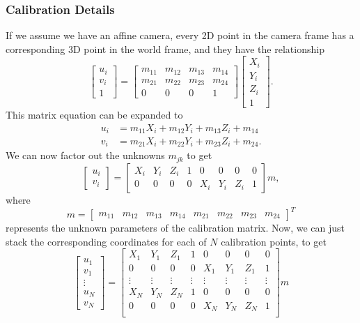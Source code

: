 \documentclass[letterpaper, 10 pt, conference]{ieeeconf}  %
\begin{document}
\subsubsection{Calibration Details}
If we assume we have an affine camera, every 2D point in the camera frame has a corresponding 3D point in the world frame, and they have the relationship
\[
\left[\begin{array}{c}u_i \\v_i \\1\end{array}\right] =  
\left[\begin{array}{cccc}
m_{11} & m_{12} & m_{13} & m_{14} \\
m_{21} & m_{22} & m_{23} & m_{24} \\
0 & 0 & 0 & 1\end{array}\right]
\left[\begin{array}{c}X_i\\Y_i\\Z_i\\1\end{array}\right].
\]
This matrix equation can be expanded to
\begin{align*}
u_i &= m_{11}X_i + m_{12} Y_i + m_{13}Z_i + m_{14}\\
v_i &= m_{21}X_i + m_{22} Y_i + m_{23}Z_i + m_{24}.
\end{align*}
We can now factor out the unknowns $m_{jk}$ to get
\[
\left[\begin{array}{c}u_i \\v_i\end{array}\right] =  
\left[\begin{array}{cccccccc}
X_i & Y_i & Z_i & 1 & 0 & 0 & 0 & 0 \\
0 & 0 & 0 & 0 & X_i & Y_i & Z_i & 1 \end{array}\right]
m,
\]
where 
\[m = \left[\begin{array}{cccccccc}
m_{11}& m_{12}& m_{13}& m_{14}& m_{21}&m_{22}&m_{23}& m_{24}
\end{array}\right]^T\]
 represents the unknown parameters of the calibration matrix.
Now, we can just stack the corresponding coordinates for each of $N$ calibration points, to get
\[
\left[\begin{array}{c}u_1 \\v_1 \\\vdots \\ u_N \\ v_N\end{array}\right]=
\left[\begin{array}{cccccccc}
X_1 & Y_1 & Z_1 & 1 & 0 & 0 & 0 & 0 \\
0 & 0 & 0 & 0 & X_1 & Y_1 & Z_1 & 1 \\
\vdots  & \vdots  & \vdots  & \vdots   & \vdots &\vdots &\vdots &\vdots \\
X_N & Y_N & Z_N & 1 & 0 & 0 & 0 & 0 \\
0 & 0 & 0 & 0 & X_N & Y_N & Z_N & 1 \\ \end{array}\right]m
\]
\end{document}
